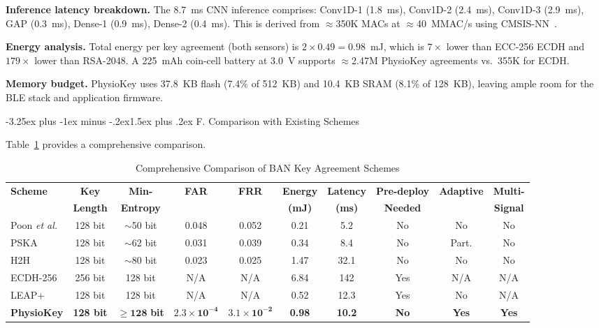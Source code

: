 \documentclass[10pt,twocolumn]{article}
\makeatletter
\renewcommand{\subsection}{\@startsection{subsection}{2}{\z@}%
  {-3.25ex plus -1ex minus -.2ex}{1.5ex plus .2ex}%
  {\normalfont\normalsize\bfseries\itshape}}
\newcommand{\etal}{\textit{et al.}}
\makeatother
\begin{document}
\textbf{Inference latency breakdown.} The 8.7~ms CNN inference comprises: Conv1D-1 (1.8~ms), Conv1D-2 (2.4~ms), Conv1D-3 (2.9~ms), GAP (0.3~ms), Dense-1 (0.9~ms), Dense-2 (0.4~ms). This is derived from $\approx$350K MACs at $\approx$40~MMAC/s using CMSIS-NN~\cite{lai2018cmsis}.

\textbf{Energy analysis.} Total energy per key agreement (both sensors) is $2 \times 0.49 = 0.98$~mJ, which is $7\times$ lower than ECC-256 ECDH and $179\times$ lower than RSA-2048. A 225~mAh coin-cell battery at 3.0~V supports $\approx$2.47M PhysioKey agreements vs.\ 355K for ECDH.

\textbf{Memory budget.} PhysioKey uses 37.8~KB flash (7.4\% of 512~KB) and 10.4~KB SRAM (8.1\% of 128~KB), leaving ample room for the BLE stack and application firmware.

\subsection{F. Comparison with Existing Schemes}
\label{subsec:comparison}

Table~\ref{tab:comparison} provides a comprehensive comparison.

\begin{table}[!t]
\centering
\caption{Comprehensive Comparison of BAN Key Agreement Schemes}
\label{tab:comparison}
\small
\begin{tabular}{l|c|c|c|c|c|c|c|c|c}
\hline
\textbf{Scheme} & \textbf{Key} & \textbf{Min-} & \textbf{FAR} & \textbf{FRR} & \textbf{Energy} & \textbf{Latency} & \textbf{Pre-deploy} & \textbf{Adaptive} & \textbf{Multi-} \\
 & \textbf{Length} & \textbf{Entropy} & & & \textbf{(mJ)} & \textbf{(ms)} & \textbf{Needed} & & \textbf{Signal} \\
\hline\hline
Poon \etal~\cite{poon2006novel} & 128 bit & $\sim$50 bit & 0.048 & 0.052 & 0.21 & 5.2 & No & No & No \\
\hline
PSKA~\cite{venkatasubramanian2010pska} & 128 bit & $\sim$62 bit & 0.031 & 0.039 & 0.34 & 8.4 & No & Part. & No \\
\hline
H2H~\cite{rostami2013heart} & 128 bit & $\sim$80 bit & 0.023 & 0.025 & 1.47 & 32.1 & No & No & No \\
\hline
ECDH-256 & 256 bit & 128 bit & N/A & N/A & 6.84 & 142 & Yes & N/A & N/A \\
\hline
LEAP+~\cite{zhu2006leap} & 128 bit & 128 bit & N/A & N/A & 0.52 & 12.3 & Yes & No & N/A \\
\hline\hline
\textbf{PhysioKey} & \textbf{128 bit} & $\mathbf{\geq 128}$ \textbf{bit} & $\mathbf{2.3{\times}10^{-4}}$ & $\mathbf{3.1{\times}10^{-2}}$ & \textbf{0.98} & \textbf{10.2} & \textbf{No} & \textbf{Yes} & \textbf{Yes} \\
\hline
\end{tabular}
\end{table}
\end{document}
